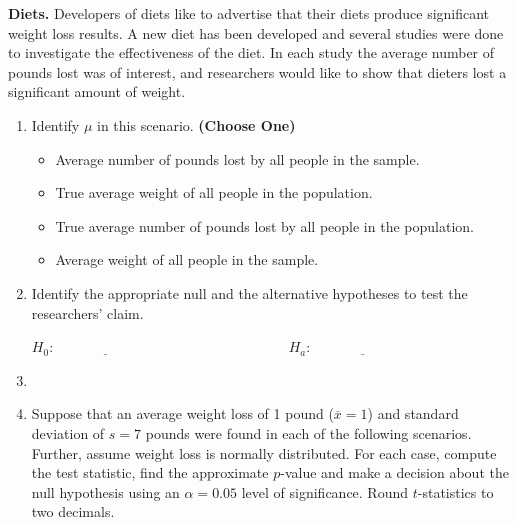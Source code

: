 \item  \textbf{Diets.}  Developers of diets like to advertise that their diets produce significant weight loss results.  A new diet has been developed and several studies were done to investigate the effectiveness of the diet. In each study the average number of pounds lost was of interest, and researchers would like to show that dieters lost a significant amount of weight.
\begin{enumerate}
\item Identify $\mu$ in this scenario. \textbf{(Choose One)}
\begin{itemize}
	\item Average number of pounds lost by all people in the sample.
	\item True average weight of all people in the population.
	\item True average number of pounds lost by all people in the population.
	\item Average weight of all people in the sample.
\end{itemize}
\newpage
\item  Identify the appropriate null and the alternative hypotheses to test the researchers' claim.
\begin{center}
\vspace{.5cm}
$H_0:\underline{\hspace{3cm}} \hspace{4cm} H_a:\underline{\hspace{3cm}}$
\end{center}
\item[]
\item Suppose that an average weight loss of 1 pound (${\overline x} = 1$) and standard deviation of $s = 7$ pounds were found in each of the following scenarios. Further, assume weight loss is normally distributed. For each case, compute the test statistic, find the approximate $p$-value and make a decision about the null hypothesis using an $\alpha = 0.05$ level of significance. Round $t$-statistics to two decimals.


\end{enumerate}
